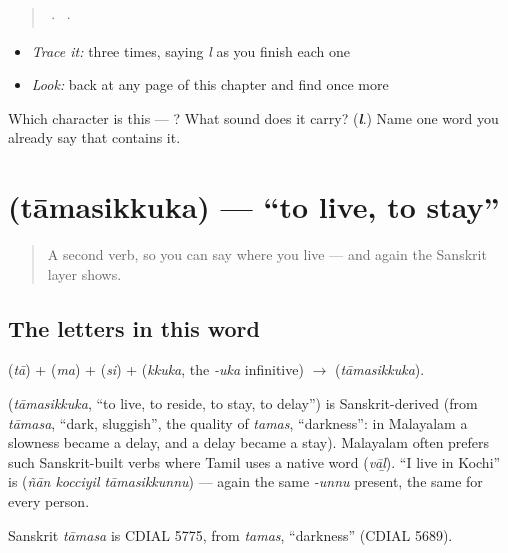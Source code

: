 \begin{quote}
  ·    ·  
\end{quote}

\begin{itemize}
\raggedright
  \item \emph{Trace it:}  three times, saying \emph{l} as you finish each one
  \item \emph{Look:} back at any page of this chapter and find  once more
\end{itemize}

\begin{tcolorbox}[breakable,colback=teal!4,colframe=teal!35!black,title={Before you move on}]
Which character is this — ? What sound does it carry? (\emph{\textbf{l}}.) Name one word you already say that contains it.
\end{tcolorbox}
\section[\texorpdfstring{\ml{താമസിക്കുക} (tāmasikkuka)}{താമസിക്കുക (tāmasikkuka)}]{ (tāmasikkuka) — \textquotedblleft{}to live, to stay\textquotedblright{}}

\label{lesson:ML-C05-taamasikkuka}



\begin{quote}
A second verb, so you can say where you live — and again the Sanskrit layer shows.
\end{quote}

\subsection*{The letters in this word}
\textbf{} (\emph{tā}) + \textbf{} (\emph{ma}) + \textbf{} (\emph{si}) + \textbf{} (\emph{kkuka}, the \emph{-uka} infinitive) $\to$ \textbf{} (\emph{tāmasikkuka}).

\begin{cousinweb}
\textbf{} (\emph{tāmasikkuka}, \textquotedblleft{}to live, to reside, to stay, to delay\textquotedblright{}) is Sanskrit-derived (from \emph{tāmasa}, \textquotedblleft{}dark, sluggish\textquotedblright{}, the quality of \emph{tamas}, \textquotedblleft{}darkness\textquotedblright{}: in Malayalam a slowness became a delay, and a delay became a stay). Malayalam often prefers such Sanskrit-built verbs where Tamil uses a native word (\emph{vāḻ}). \textquotedblleft{}I live in Kochi\textquotedblright{} is \textbf{  } (\emph{ñān kocciyil tāmasikkunnu}) — again the same \emph{-unnu} present, the same for every person.

Sanskrit \emph{tāmasa} is CDIAL 5775, from \emph{tamas}, \textquotedblleft{}darkness\textquotedblright{} (CDIAL 5689).
\end{cousinweb}

